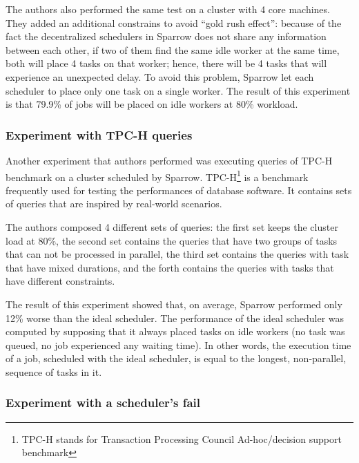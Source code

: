 \documentclass[11pt]{article}
\begin{document}
            The authors also performed the same test on a cluster with 4 core machines. They added an additional constrains to avoid ``gold rush effect'': because of the fact the decentralized schedulers in Sparrow does not share any information between each other, if two of them find the same idle worker at the same time, both will place 4 tasks on that worker; hence, there will be 4 tasks that will experience an unexpected delay. To avoid this problem, Sparrow let each scheduler to place only one task on a single worker. The result of this experiment is that 79.9\% of jobs will be placed on idle workers at 80\% workload.
            
            
        \subsubsection*{Experiment with TPC-H queries}
        
        	Another experiment that authors performed was executing queries of TPC-H benchmark on a cluster scheduled by Sparrow. TPC-H\footnote{TPC-H stands for Transaction Processing Council Ad-hoc/decision support benchmark} is a benchmark frequently used for testing the performances of database software. It contains sets of queries that are inspired by real-world scenarios.
            
            The authors composed 4 different sets of queries: the first set keeps the cluster load at 80\%, the second set contains the queries that have two groups of tasks that can not be processed in parallel, the third set contains the queries with task that have mixed durations, and the forth contains the queries with tasks that have different constraints.
            
            The result of this experiment showed that, on average, Sparrow performed only 12\% worse than the ideal scheduler. The performance of the ideal scheduler was computed by supposing that it always placed tasks on idle workers (no task was queued, no job experienced any waiting time). In other words, the execution time of a job, scheduled with the ideal scheduler, is equal to the longest, non-parallel, sequence of tasks in it.
        
        
        \subsubsection*{Experiment with a scheduler's fail}
        
\end{document}
